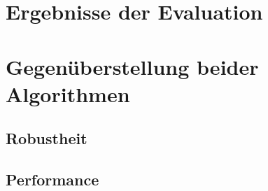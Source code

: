 \section{Ergebnisse der Evaluation}
\label{sec:anforderunsevaluierung}


\section{Gegenüberstellung beider Algorithmen}
\label{sec:gegenueberstellung}

\subsection{Robustheit}
\label{subsec:discussion_robsutness}
	
	
	

\subsection{Performance}
\label{subsec:discussion_performance}
  

